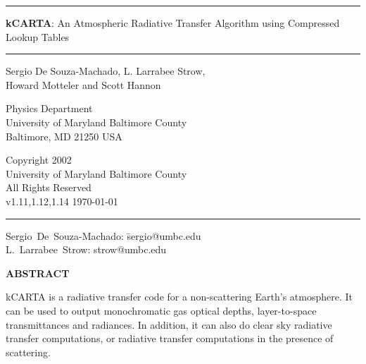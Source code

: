 \documentclass[12pt]{article}
\newcommand{\kc}{\textsf{kCARTA}\xspace}
\newcommand{\HRule}{\rule{\linewidth}{1mm}}
\newcommand{\HRulethin}{\rule{\linewidth}{0.5mm}}
\begin{document}
\thispagestyle{empty}
\vspace{2.0in}

\noindent\HRule
\begin{center}
\Huge \textbf{\textsf{kCARTA}}: An Atmospheric Radiative Transfer Algorithm 
using Compressed Lookup Tables
\end{center}
\noindent\HRule

\vspace{0.75in}
\begin{center}
\begin{Large}
Sergio De Souza-Machado, L. Larrabee Strow,\\ Howard Motteler and Scott
Hannon
\end{Large}
\end{center}

\vspace{0.5in}
\begin{center}
Physics Department\\
University of Maryland Baltimore County\\Baltimore, MD 21250 USA\\
\end{center}

\vspace{0.5in}
\begin{center}
Copyright 2002 \\
University of Maryland Baltimore County \\
All Rights Reserved\\
v1.11,1.12,1.14  \today\\
\end{center}

\vfill

\noindent\HRulethin
\begin{flushleft}
\begin{tabbing}
Sergio~De~Souza-Machado: \=    sergio@umbc.edu \\
L.~Larrabee~Strow:   \>        strow@umbc.edu\\
\end{tabbing}
\end{flushleft}


\newpage
\tableofcontents
\listoftables
\listoffigures
\newpage

\begin{center}
{\bf ABSTRACT}
\end{center}
\kc is a radiative transfer code for a non-scattering Earth's
atmosphere.  It can be used to output monochromatic gas optical
depths, layer-to-space transmittances and radiances.  In addition, it can also 
do clear sky radiative transfer computations, or radiative transfer 
computations in the presence of scattering.
\end{document}
